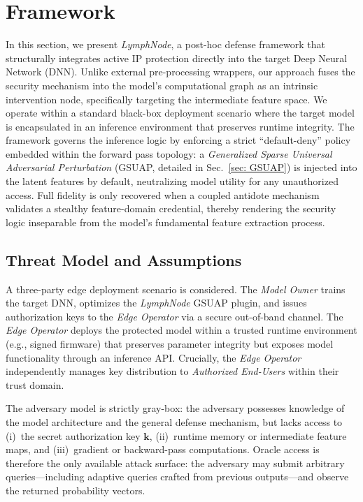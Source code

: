 \documentclass[conference]{IEEEtran}
\begin{document}
\section{Framework}
\label{sec:Method}

In this section, we present \textit{LymphNode}, a post-hoc defense framework that structurally integrates active IP protection directly into the target Deep Neural Network (DNN). Unlike external pre-processing wrappers, our approach fuses the security mechanism into the model's computational graph as an intrinsic intervention node, specifically targeting the intermediate feature space. We operate within a standard black-box deployment scenario where the target model is encapsulated in an inference environment that preserves runtime integrity. The framework governs the inference logic by enforcing a strict ``default-deny'' policy embedded within the forward pass topology: a \textit{Generalized Sparse Universal Adversarial Perturbation} (GSUAP, detailed in Sec.~\ref{sec: GSUAP}) is injected into the latent features by default, neutralizing model utility for any unauthorized access. Full fidelity is only recovered when a coupled antidote mechanism validates a stealthy feature-domain credential, thereby rendering the security logic inseparable from the model's fundamental feature extraction process.

\subsection{Threat Model and Assumptions}
\label{sec:threat_model}

A three-party edge deployment scenario is considered. The \textit{Model Owner} trains the target DNN, optimizes the \textit{LymphNode} GSUAP plugin, and issues authorization keys to the \textit{Edge Operator} via a secure out-of-band channel. The \textit{Edge Operator} deploys the protected model within a trusted runtime environment (e.g., signed firmware) that preserves parameter integrity but exposes model functionality through an inference API. Crucially, the \textit{Edge Operator} independently manages key distribution to \textit{Authorized End-Users} within their trust domain.

The adversary model is strictly gray-box: the adversary possesses knowledge of the model architecture and the general defense mechanism, but lacks access to (i)~the secret authorization key $\mathbf{k}$, (ii)~runtime memory or intermediate feature maps, and (iii)~gradient or backward-pass computations. Oracle access is therefore the only available attack surface: the adversary may submit arbitrary queries---including adaptive queries crafted from previous outputs---and observe the returned probability vectors.
\end{document}
